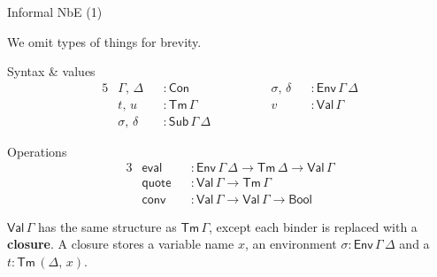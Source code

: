 \documentclass[dvipsnames]{beamer}
\newcommand{\ms}[1]{\mathsf{#1}}
\newcommand{\Con}{\mathsf{Con}}
\newcommand{\Sub}{\mathsf{Sub}}
\newcommand{\Tm}{\mathsf{Tm}}
\newcommand{\Bool}{\ms{Bool}}
\newcommand{\Env}{\ms{Env}}
\newcommand{\Val}{\ms{Val}}
\newcommand{\eval}{\ms{eval}}
\newcommand{\qt}{\ms{quote}}
\begin{document}
\begin{frame}{Informal NbE (1)}

We omit types of things for brevity.
\begin{block}{Syntax \& values}
\vspace{-1.5em}
\begin{alignat*}{5}
  & \Gamma,\,\Delta &&: \Con        \hspace{5em}&& \sigma,\,\delta &&: \Env\,\Gamma\,\Delta\\
  & t,\,u           &&: \Tm\,\Gamma && v               &&: \Val\,\Gamma \\
  & \sigma,\,\delta &&: \Sub\,\Gamma\,\Delta
\end{alignat*}
\end{block}
\begin{block}{Operations}
\vspace{-1.5em}
\begin{alignat*}{3}
 & \eval     &&: \Env\,\Gamma\,\Delta \to \Tm\,\Delta \to \Val\,\Gamma \\
 & \qt       &&: \Val\,\Gamma \to \Tm\,\Gamma \\
 & \ms{conv} &&: \Val\,\Gamma \to \Val\,\Gamma \to \Bool
\end{alignat*}
\end{block}

\vspace{0.5em}

$\Val\,\Gamma$ has the same structure as $\Tm\,\Gamma$,
except each binder is replaced with a \textbf{closure}.
A closure stores a variable name $x$, an environment $\sigma : \Env\,\Gamma\,\Delta$ and
a $t : \Tm\,(\Delta,\,x)$.

\end{frame}
\end{document}
